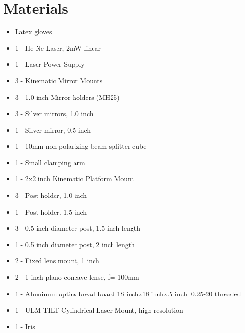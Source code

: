 \section{Materials}

\begin{itemize} \itemsep1pt \parskip0pt 
  \item Latex gloves
  \item 1 - He-Ne Laser, 2mW linear
  \item 1 - Laser Power Supply
  \item 3 - Kinematic Mirror Mounts
  \item 3 - 1.0 inch Mirror holders (MH25)
  \item 3 - Silver mirrors, 1.0 inch
  \item 1 - Silver mirror, 0.5 inch
  \item 1 - 10mm non-polarizing beam splitter cube
  \item 1 - Small clamping arm
  \item 1 - 2x2 inch Kinematic Platform Mount
  \item 3 - Post holder, 1.0 inch
  \item 1 - Post holder, 1.5 inch
  \item 3 - 0.5 inch diameter post, 1.5 inch length
  \item 1 - 0.5 inch diameter post, 2 inch length
  \item 2 - Fixed lens mount, 1 inch
  \item 2 - 1 inch plano-concave lense, f=-100mm
  \item 1 - Aluminum optics bread board 18 inchx18 inchx.5 inch, 0.25-20
  threaded
  \item 1 - ULM-TILT Cylindrical Laser Mount, high resolution
  \item 1 - Iris
\end{itemize}

        
        
        
        
        
        
        
        
        
        
        
        
        
